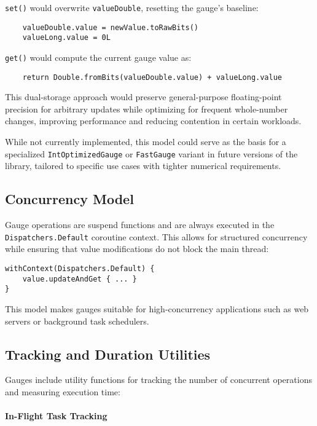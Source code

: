     \texttt{set()} would overwrite \texttt{valueDouble}, resetting the gauge’s baseline:
    \begin{verbatim}
    valueDouble.value = newValue.toRawBits()
    valueLong.value = 0L
    \end{verbatim}

    \texttt{get()} would compute the current gauge value as:
    \begin{verbatim}
    return Double.fromBits(valueDouble.value) + valueLong.value
    \end{verbatim}

This dual-storage approach would preserve general-purpose floating-point precision for arbitrary updates while optimizing for frequent whole-number changes, improving performance and reducing contention in certain workloads.

While not currently implemented, this model could serve as the basis for a specialized \texttt{IntOptimizedGauge} or \texttt{FastGauge} variant in future versions of the library, tailored to specific use cases with tighter numerical requirements.




\subsection{Concurrency Model}
Gauge operations are suspend functions and are always executed in the \texttt{Dispatchers.Default} coroutine context. This allows for structured concurrency while ensuring that value modifications do not block the main thread:

\begin{verbatim}
withContext(Dispatchers.Default) {
    value.updateAndGet { ... }
}
\end{verbatim}

This model makes gauges suitable for high-concurrency applications such as web servers or background task schedulers.

\subsection{Tracking and Duration Utilities}
Gauges include utility functions for tracking the number of concurrent operations and measuring execution time:

\paragraph{In-Flight Task Tracking}

